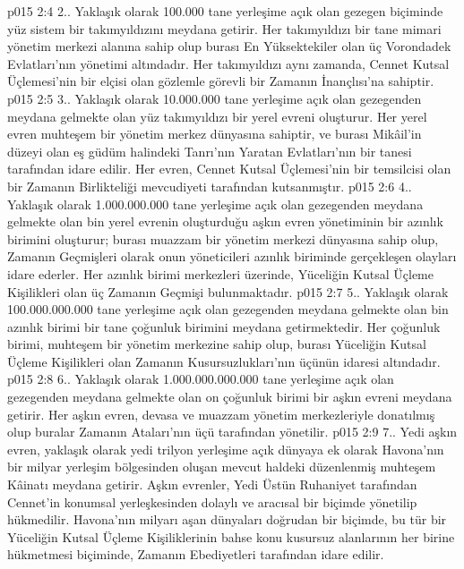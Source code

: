 \vs p015 2:4 2.\bibnobreakspace {}. Yaklaşık olarak 100.000 tane yerleşime açık olan gezegen biçiminde yüz sistem bir takımyıldızını meydana getirir. Her takımyıldızı bir tane mimari yönetim merkezi alanına sahip olup burası En Yüksektekiler olan üç Vorondadek Evlatları’nın yönetimi altındadır. Her takımyıldızı aynı zamanda, Cennet Kutsal Üçlemesi’nin bir elçisi olan gözlemle görevli bir Zamanın İnançlısı’na sahiptir.
\vs p015 2:5 3.\bibnobreakspace {}. Yaklaşık olarak 10.000.000 tane yerleşime açık olan gezegenden meydana gelmekte olan yüz takımyıldızı bir yerel evreni oluşturur. Her yerel evren muhteşem bir yönetim merkez dünyasına sahiptir, ve burası Mikâil’in düzeyi olan eş güdüm halindeki Tanrı'nın Yaratan Evlatları’nın bir tanesi tarafından idare edilir. Her evren, Cennet Kutsal Üçlemesi’nin bir temsilcisi olan bir Zamanın Birlikteliği mevcudiyeti tarafından kutsanmıştır.
\vs p015 2:6 4.\bibnobreakspace {}. Yaklaşık olarak 1.000.000.000 tane yerleşime açık olan gezegenden meydana gelmekte olan bin yerel evrenin oluşturduğu aşkın evren yönetiminin bir azınlık birimini oluşturur; burası muazzam bir yönetim merkezi dünyasına sahip olup, Zamanın Geçmişleri olarak onun yöneticileri azınlık biriminde gerçekleşen olayları idare ederler. Her azınlık birimi merkezleri üzerinde, Yüceliğin Kutsal Üçleme Kişilikleri olan üç Zamanın Geçmişi bulunmaktadır.
\vs p015 2:7 5.\bibnobreakspace {}. Yaklaşık olarak 100.000.000.000 tane yerleşime açık olan gezegenden meydana gelmekte olan bin azınlık birimi bir tane çoğunluk birimini meydana getirmektedir. Her çoğunluk birimi, muhteşem bir yönetim merkezine sahip olup, burası Yüceliğin Kutsal Üçleme Kişilikleri olan Zamanın Kusursuzlukları’nın üçünün idaresi altındadır.
\vs p015 2:8 6.\bibnobreakspace {}. Yaklaşık olarak 1.000.000.000.000 tane yerleşime açık olan gezegenden meydana gelmekte olan on çoğunluk birimi bir aşkın evreni meydana getirir. Her aşkın evren, devasa ve muazzam yönetim merkezleriyle donatılmış olup buralar Zamanın Ataları’nın üçü tarafından yönetilir.
\vs p015 2:9 7.\bibnobreakspace {}. Yedi aşkın evren, yaklaşık olarak yedi trilyon yerleşime açık dünyaya ek olarak Havona’nın bir milyar yerleşim bölgesinden oluşan mevcut haldeki düzenlenmiş muhteşem Kâinatı meydana getirir. Aşkın evrenler, Yedi Üstün Ruhaniyet tarafından Cennet’in konumsal yerleşkesinden dolaylı ve aracısal bir biçimde yönetilip hükmedilir. Havona’nın milyarı aşan dünyaları doğrudan bir biçimde, bu tür bir Yüceliğin Kutsal Üçleme Kişiliklerinin bahse konu kusursuz alanlarının her birine hükmetmesi biçiminde, Zamanın Ebediyetleri tarafından idare edilir.
